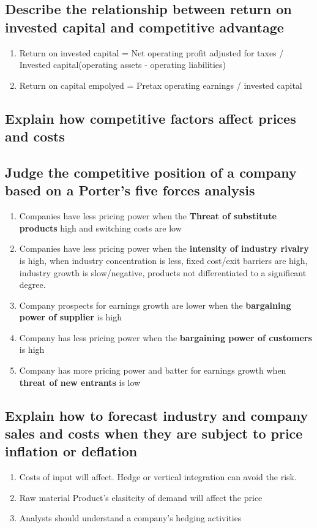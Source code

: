\documentclass{article}
\newcommand{\be}{\begin{enumerate}}
\newcommand{\ee}{\end{enumerate}}
\begin{document}
\subsection{Describe the relationship between return on invested capital and competitive
advantage}
\be
    \item Return  on invested capital = Net operating profit adjusted for taxes /
        Invested capital(operating assets - operating liabilities)
    \item Return on capital empolyed = Pretax operating earnings / invested capital
\ee
\subsection{Explain how competitive factors affect prices and costs}
\subsection{Judge the competitive position of a company based on a Porter's five forces analysis}
\be
    \item Companies have less pricing power when the \textbf{Threat of substitute products}
        high and switching costs are low
    \item Companies have less pricing power when the \textbf{intensity of industry rivalry}
        is high, when industry concentration is less, fixed cost/exit barriers are high, industry
        growth is slow/negative, products not differentiated to a significant degree.
    \item Company prospects for earnings growth are lower when the \textbf{bargaining
        power of supplier} is high
    \item Company has less pricing power when the \textbf{bargaining power of customers} is high
    \item Company has more pricing power and batter for earnings growth when \textbf{threat of new entrants}
        is low
\ee
\subsection{Explain how to forecast industry and company sales and costs when they
are subject to price inflation or deflation}
\be
    \item Costs of input will affect. Hedge or vertical integration can avoid the
        risk.
    \item Raw material Product's elasitcity of demand will affect the price
    \item Analysts should understand a company's hedging activities
\ee
\end{document}
